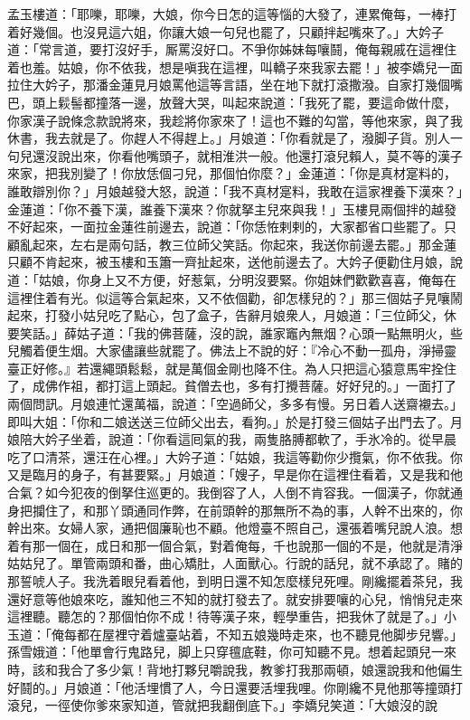{}孟玉樓道：「耶嚛，耶嚛，大娘，你今日怎的這等惱的大發了，連累俺每，一棒打着好幾個。也沒見這六姐，你讓大娘一句兒也罷了，只顧拌起嘴來了。」大妗子道：「常言道，要打沒好手，厮罵沒好口。不爭你姊妹每嚷鬪，俺每親戚在這裡住着也羞。姑娘，你不依我，想是嗔我在這裡，叫轎子來我家去罷！」被李嬌兒一面拉住大妗子，那潘金蓮見月娘罵他這等言語，坐在地下就打滾撒潑。{}自家打幾個嘴巴，{}頭上鬏髻都撞落一邊，放聲大哭，叫起來說道：「我死了罷，要這命做什麼，你家漢子說條念款說將來，我趁將你家來了！這也不難的勾當，等他來家，與了我休書，我去就是了。你趕人不得趕上。」月娘道：「你看就是了，潑脚子貨。別人一句兒還沒說出來，你看他嘴頭子，就相淮洪一般。他還打滾兒賴人，莫不等的漢子來家，把我別變了！你放恁個刁兒，那個怕你麼？」金蓮道：「你是真材寔料的，誰敢辯別你？」月娘越發大怒，說道：「我不真材寔料，我敢在這家裡養下漢來？」{}金蓮道：「你不養下漢，誰養下漢來？你就拏主兒來與我！」{}玉樓見兩個拌的越發不好起來，一面拉金蓮徃前邊去，說道：「你恁恠剌剌的，大家都省口些罷了。只顧亂起來，左右是兩句話，教三位師父笑話。你起來，我送你前邊去罷。」那金蓮只顧不肯起來，被玉樓和玉簫一齊扯起來，送他前邊去了。大妗子便勸住月娘，說道：「姑娘，你身上又不方便，好惹氣，分明沒要緊。你姐妹們歡歡喜喜，俺每在這裡住着有光。似這等合氣起來，又不依個勸，卻怎樣兒的？」那三個姑子見嚷鬧起來，打發小姑兒吃了點心，包了盒子，告辭月娘衆人，月娘道：「三位師父，休要笑話。」薛姑子道：「我的佛菩薩，沒的說，誰家竈內無烟？心頭一點無明火，些兒觸着便生烟。大家儘讓些就罷了。{}佛法上不說的好：『冷心不動一孤舟，淨掃靈臺正好修。』若還繩頭鬆鬆，就是萬個金剛也降不住。為人只把這心猿意馬牢拴住了，成佛作祖，都打這上頭起。{}貧僧去也，多有打攪菩薩。好好兒的。」一面打了兩個問訊。月娘連忙還萬福，說道：「空過師父，多多有慢。另日着人送齋襯去。」即叫大姐：「你和二娘送送三位師父出去，看狗。」於是打發三個姑子出門去了。月娘陪大妗子坐着，說道：「你看這囘氣的我，兩隻胳膊都軟了，手氷冷的。從早晨吃了口清茶，還汪在心裡。」大妗子道：「姑娘，我這等勸你少攬氣，你不依我。你又是臨月的身子，有甚要緊。」月娘道：「嫂子，早是你在這裡住看着，又是我和他合氣？如今犯夜的倒拏住巡更的。我倒容了人，人倒不肯容我。{}一個漢子，你就通身把攔住了，和那丫頭通同作弊，在前頭幹的那無所不為的事，人幹不出來的，你幹出來。女婦人家，通把個廉恥也不顧。他燈臺不照自己，還張着嘴兒說人浪。想着有那一個在，成日和那一個合氣，對着俺每，千也說那一個的不是，他就是清淨姑姑兒了。單管兩頭和番，曲心矯肚，人面獸心。行說的話兒，就不承認了。賭的那誓唬人子。我洗着眼兒看着他，到明日還不知怎麼樣兒死哩。剛纔擺着茶兒，我還好意等他娘來吃，誰知他三不知的就打發去了。就安排要嚷的心兒，悄悄兒走來這裡聽。聽怎的？那個怕你不成！待等漢子來，輕學重告，把我休了就是了。」小玉道：「俺每都在屋裡守着爐臺站着，不知五娘幾時走來，也不聽見他脚步兒響。」孫雪娥道：「他單會行鬼路兒，脚上只穿氊底鞋，你可知聽不見。想着起頭兒一來時，該和我合了多少氣！背地打夥兒嚼說我，教爹打我那兩頓，娘還說我和他偏生好鬪的。」{}月娘道：「他活埋慣了人，今日還要活埋我哩。你剛纔不見他那等撞頭打滾兒，一徑使你爹來家知道，管就把我翻倒底下。」李嬌兒笑道：「大娘沒的說